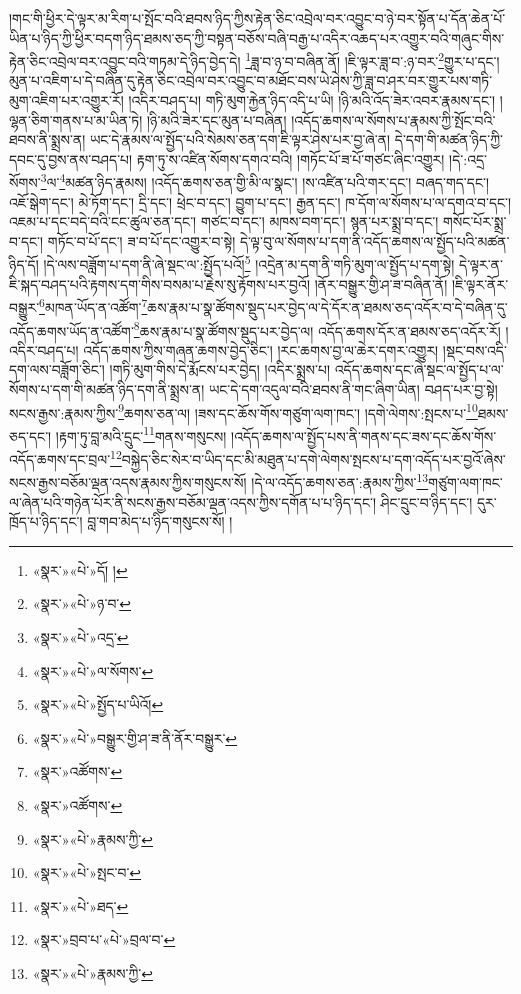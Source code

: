 །གང་གི་ཕྱིར་དེ་ལྟར་མ་རིག་པ་སྤོང་བའི་ཐབས་ཉིད་ཀྱིས་རྟེན་ཅིང་འབྲེལ་བར་འབྱུང་བ་ཉེ་བར་སྟོན་པ་དོན་ཆེན་པོ་ཡིན་པ་ཉིད་ཀྱི་ཕྱིར་བདག་ཉིད་ཐམས་ཅད་ཀྱི་བསྟན་བཅོས་བཞི་བརྒྱ་པ་འདིར་འཆད་པར་འགྱུར་བའི་གཞུང་གིས་རྟེན་ཅིང་འབྲེལ་བར་འབྱུང་བའི་གཏམ་དེ་ཉིད་བྱེད་དེ། \footnote{«སྣར་»«པེ་»དོ། ། }ཟླ་བ་ཉ་བ་བཞིན་ནོ། །ཇི་ལྟར་ཟླ་བ་:ཉ་བར་\footnote{«སྣར་»«པེ་»ཉ་བ་}གྱུར་པ་དང་། མུན་པ་འཇིག་པ་དེ་བཞིན་དུ་རྟེན་ཅིང་འབྲེལ་བར་འབྱུང་བ་མཐོང་བས་ཡེ་ཤེས་ཀྱི་ཟླ་བ་ཤར་བར་གྱུར་པས་གཏི་མུག་འཇིག་པར་འགྱུར་རོ། །འདིར་བཤད་པ། གཏི་མུག་རྐྱེན་ཉིད་འདི་པ་ཡི། །ཉི་མའི་འོད་ཟེར་འབར་རྣམས་དང་། །ལྷན་ཅིག་གནས་པ་མ་ཡིན་ཏེ། །ཉི་མའི་ཟེར་དང་མུན་པ་བཞིན། །འདོད་ཆགས་ལ་སོགས་པ་རྣམས་ཀྱི་སྤོང་བའི་ཐབས་ནི་སྨྲས་ན། ཡང་དེ་རྣམས་ལ་སྤྱོད་པའི་སེམས་ཅན་དག་ཇི་ལྟར་ཤེས་པར་བྱ་ཞེ་ན། དེ་དག་གི་མཚན་ཉིད་ཀྱི་དབང་དུ་བྱས་ནས་བཤད་པ། རྟག་ཏུ་ས་འཛིན་སོགས་དགའ་བའི། །གཏོང་པོ་ཟ་པོ་གཙང་ཞིང་འགྱུར། །དེ་:འདྲ་སོགས་\footnote{«སྣར་»«པེ་»འདྲ་}ལ་\footnote{«སྣར་»«པེ་»ལ་སོགས་}མཚན་ཉིད་རྣམས། །འདོད་ཆགས་ཅན་གྱི་མི་ལ་སྣང་། །ས་འཛིན་པའི་གར་དང་། བཞད་གད་དང་། འཇོ་སྒེག་དང་། མེ་ཏོག་དང་། དྲི་དང་། ཕྲེང་བ་དང་། བྱུག་པ་དང་། རྒྱན་དང་། ཁ་དོག་ལ་སོགས་པ་ལ་དགའ་བ་དང་། འཇམ་པ་དང་བདེ་བའི་ངང་ཚུལ་ཅན་དང་། གཙང་བ་དང་། མཁས་བག་དང་། སྙན་པར་སྨྲ་བ་དང་། གསོང་པོར་སྨྲ་བ་དང་། གཏོང་བ་པོ་དང་། ཟ་བ་པོ་དང་འགྱུར་བ་སྟེ། དེ་ལྟ་བུ་ལ་སོགས་པ་དག་ནི་འདོད་ཆགས་ལ་སྤྱོད་པའི་མཚན་ཉིད་དོ། །དེ་ལས་བཟློག་པ་དག་ནི་ཞེ་སྡང་ལ་:སྤྱོད་པའོ།\footnote{«སྣར་»«པེ་»སྤྱོད་པ་ཡིའོ།} །འདྲེན་མ་དག་ནི་གཏི་མུག་ལ་སྤྱོད་པ་དག་སྟེ། དེ་ལྟར་ན་ཇི་སྐད་བཤད་པའི་རྟགས་དག་གིས་བསམ་པ་རྗེས་སུ་རྟོགས་པར་བྱའོ། །ནོར་བསྒྱུར་གྱི་ཤ་ཟ་བཞིན་ནོ། །ཇི་ལྟར་ནོར་བསྒྱུར་\footnote{«སྣར་»«པེ་»བསྒྱུར་གྱི་ཤ་ཟ་ནི་ནོར་བསྒྱུར་}མཁན་ཡོད་ན་འཚོག་\footnote{«སྣར་»འཚོགས་}ཆས་རྣམ་པ་སྣ་ཚོགས་སྡུད་པར་བྱེད་ལ་དེ་དོར་ན་ཐམས་ཅད་འདོར་བ་དེ་བཞིན་དུ་འདོད་ཆགས་ཡོད་ན་འཚོག་\footnote{«སྣར་»འཚོགས་}ཆས་རྣམ་པ་སྣ་ཚོགས་སྡུད་པར་བྱེད་ལ། འདོད་ཆགས་དོར་ན་ཐམས་ཅད་འདོར་རོ། །འདིར་བཤད་པ། འདོད་ཆགས་ཀྱིས་གཞན་ཆགས་བྱེད་ཅིང་། །རང་ཆགས་བྱ་ལ་ཆེར་དགར་འགྱུར། །སྡང་བས་འདི་དག་ལས་བཟློག་ཅིང་། །གཏི་མུག་གིས་དེ་རྨོངས་པར་བྱེད། །འདིར་སྨྲས་པ། འདོད་ཆགས་དང་ཞེ་སྡང་ལ་སྤྱོད་པ་ལ་སོགས་པ་དག་གི་མཚན་ཉིད་དག་ནི་སྨྲས་ན། ཡང་དེ་དག་འདུལ་བའི་ཐབས་ནི་གང་ཞིག་ཡིན། བཤད་པར་བྱ་སྟེ། སངས་རྒྱས་:རྣམས་ཀྱིས་\footnote{«སྣར་»«པེ་»རྣམས་ཀྱི་}ཆགས་ཅན་ལ། །ཟས་དང་ཆོས་གོས་གཙུག་ལག་ཁང་། །དགེ་ལེགས་:སྤངས་པ་\footnote{«སྣར་»«པེ་»སྤང་བ་}ཐམས་ཅད་དང་། །རྟག་ཏུ་བླ་མའི་དྲུང་\footnote{«སྣར་»«པེ་»ཐད་}གནས་གསུངས། །འདོད་ཆགས་ལ་སྤྱོད་པས་ནི་གནས་དང་ཟས་དང་ཆོས་གོས་འདོད་ཆགས་དང་བྲལ་\footnote{«སྣར་»བྲབ་པ་«པེ་»བྲལ་བ་}བསྐྱེད་ཅིང་སེར་བ་ཡིད་དང་མི་མཐུན་པ་དགེ་ལེགས་སྤངས་པ་དག་འདོད་པར་བྱའོ་ཞེས་སངས་རྒྱས་བཅོམ་ལྡན་འདས་རྣམས་ཀྱིས་གསུངས་སོ། །དེ་ལ་འདོད་ཆགས་ཅན་:རྣམས་ཀྱིས་\footnote{«སྣར་»«པེ་»རྣམས་ཀྱི་}གཙུག་ལག་ཁང་ལ་ཞེན་པའི་གཉེན་པོར་ནི་སངས་རྒྱས་བཅོམ་ལྡན་འདས་ཀྱིས་དགོན་པ་པ་ཉིད་དང་། ཤིང་དྲུང་བ་ཉིད་དང་། དུར་ཁྲོད་པ་ཉིད་དང་། བླ་གབ་མེད་པ་ཉིད་གསུངས་སོ། །
